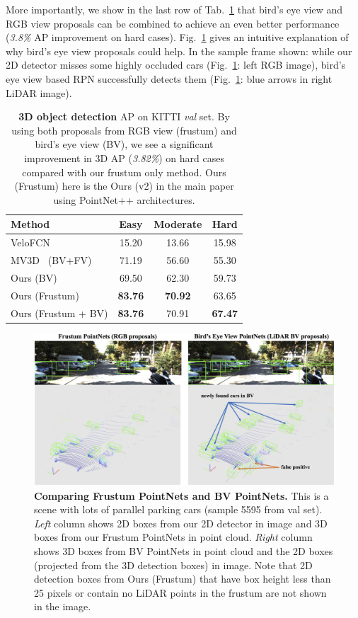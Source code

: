 More importantly, we show in the last row of Tab.~\ref{tab:td_re} that bird's eye view and RGB view proposals can be combined to achieve an even better performance (\emph{3.8\%} AP improvement on hard cases).
Fig.~\ref{fig:frustum_vs_bv} gives an intuitive explanation of why bird's eye view proposals could help. In the sample frame shown: while our 2D detector misses some highly occluded cars (Fig.~\ref{fig:frustum_vs_bv}: left RGB image), bird's eye view based RPN successfully detects them (Fig.~\ref{fig:frustum_vs_bv}: blue arrows in right LiDAR image).


\begin{table}[h!]
    \centering
    \begin{tabular}{l|ccc}
    \hline
        Method & Easy & Moderate & Hard \\ \hline
        VeloFCN~\cite{li2016vehicle} & 15.20 & 13.66 & 15.98 \\
        MV3D~\cite{cvpr17chen} (BV+FV) & 71.19 & 56.60 & 55.30 \\ \hline
        Ours (BV) &  69.50 & 62.30 & 59.73 \\
        Ours (Frustum) & \textbf{83.76} & \textbf{70.92} & 63.65 \\
        Ours (Frustum + BV) & \textbf{83.76} & 70.91 & \textbf{67.47} \\ \hline
    \end{tabular}
    \caption{\textbf{3D object detection} AP on KITTI \emph{val} set. By using both proposals from RGB view (frustum) and bird's eye view (BV), we see a significant improvement in 3D AP (\emph{3.82\%}) on hard cases compared with our frustum only method. Ours (Frustum) here is the Ours (v2) in the main paper using PointNet++ architectures.}
    \label{tab:td_re}
\end{table}

\begin{figure}[h!]
    \centering
    \includegraphics[width=\linewidth]{./fig/frustum_vs_bv.jpg}
    \caption{\textbf{Comparing Frustum PointNets and BV PointNets.} This is a scene with lots of parallel parking cars (sample 5595 from val set). \emph{Left} column shows 2D boxes from our 2D detector in image and 3D boxes from our Frustum PointNets in point cloud. \emph{Right} column shows 3D boxes from BV PointNets in point cloud and the 2D boxes (projected from the 3D detection boxes) in image. Note that 2D detection boxes from Ours (Frustum) that have box height less than 25 pixels or contain no LiDAR points in the frustum are not shown in the image.}
    \label{fig:frustum_vs_bv}
\end{figure}


